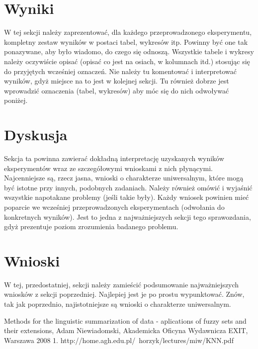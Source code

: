 \documentclass{classrep}
\begin{document}
	\section{Wyniki}
	{\color{blue}
		W tej sekcji należy zaprezentować, dla każdego przeprowadzonego eksperymentu,
		kompletny zestaw wyników w postaci tabel, wykresów itp. Powinny być one tak
		ponazywane, aby było wiadomo, do czego się odnoszą. Wszystkie tabele i wykresy
		należy oczywiście opisać (opisać co jest na osiach, w kolumnach itd.) stosując
		się do przyjętych wcześniej oznaczeń. Nie należy tu komentować i interpretować
		wyników, gdyż miejsce na to jest w kolejnej sekcji. Tu również dobrze jest
		wprowadzić oznaczenia (tabel, wykresów) aby móc się do nich odwoływać
		poniżej.}
	
	\section{Dyskusja}
	{\color{blue}
		Sekcja ta powinna zawierać dokładną interpretację uzyskanych wyników
		eksperymentów wraz ze szczegółowymi wnioskami z nich płynącymi. Najcenniejsze
		są, rzecz jasna, wnioski o charakterze uniwersalnym, które mogą być istotne
		przy innych, podobnych zadaniach. Należy również omówić i wyjaśnić wszystkie
		napotakane problemy (jeśli takie były). Każdy wniosek powinien mieć poparcie
		we wcześniej przeprowadzonych eksperymentach (odwołania do konkretnych
		wyników). Jest to jedna z najważniejszych sekcji tego sprawozdania, gdyż
		prezentuje poziom zrozumienia badanego problemu.}
	\section{Wnioski}
	{\color{blue}W tej, przedostatniej, sekcji należy zamieścić podsumowanie
		najważniejszych wniosków z sekcji poprzedniej. Najlepiej jest je po prostu
		wypunktować. Znów, tak jak poprzednio, najistotniejsze są wnioski o
		charakterze uniwersalnym.}
	
	
	\begin{thebibliography}{}
		Methods for the linguistic summarization of data - aplications of fuzzy sets and their extensions, Adam Niewiadomski, Akademicka Oficyna Wydawnicza EXIT, Warszawa 2008
		1. http://home.agh.edu.pl/~horzyk/lectures/miw/KNN.pdf
	\end{thebibliography}
\end{document}
